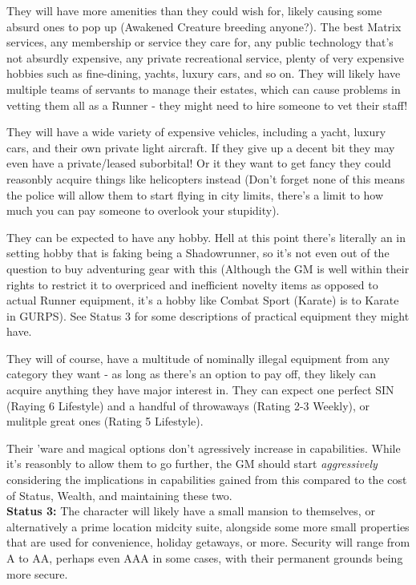 \begin{multicols}{2}
\begin{coloredbox}
	They will have more amenities than they could wish for, likely causing some absurd ones to pop up (Awakened Creature breeding anyone?). The best Matrix services, any membership or service they care for, any public technology that's not absurdly expensive, any private recreational service, plenty of very expensive hobbies such as fine-dining, yachts, luxury cars, and so on. They will likely have multiple teams of servants to manage their estates, which can cause problems in vetting them all as a Runner - they might need to hire someone to vet their staff! 
	
	They will have a wide variety of expensive vehicles, including a yacht, luxury cars, and their own private light aircraft. If they give up a decent bit they may even have a private/leased suborbital! Or it they want to get fancy they could reasonbly acquire things like helicopters instead (Don't forget none of this means the police will allow them to start flying in city limits, there's a limit to how much you can pay someone to overlook your stupidity).
	
	They can be expected to have any hobby. Hell at this point there's literally an in setting hobby that is faking being a Shadowrunner, so it's not even out of the question to buy adventuring gear with this (Although the GM is well within their rights to restrict it to overpriced and inefficient novelty items as opposed to actual Runner equipment, it's a hobby like Combat Sport (Karate) is to Karate in GURPS). See Status 3 for some descriptions of practical equipment they might have. 
	
	They will of course, have a multitude of nominally illegal equipment from any category they want - as long as there's an option to pay off, they likely can acquire anything they have major interest in. They can expect one perfect SIN (Raying 6 Lifestyle) and a handful of throwaways (Rating 2-3 Weekly), or mulitple great ones (Rating 5 Lifestyle).
	
	Their 'ware and magical options don't agressively increase in capabilities. While it's reasonbly to allow them to go further, the GM should start \textit{aggressively} considering the implications in capabilities gained from this compared to the cost of Status, Wealth, and maintaining these two.\\
	
	\textbf{Status 3:} The character will likely have a small mansion to themselves, or alternatively a prime location midcity suite, alongside some more small properties that are used for convenience, holiday getaways, or more. Security will range from A to AA, perhaps even AAA in some cases, with their permanent grounds being more secure.
	

\end{coloredbox}
\end{multicols}

